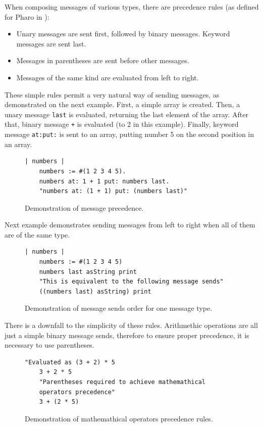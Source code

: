 \documentclass[thesis=M,english]{FITthesis}[2019/12/23]
\begin{document}
When composing messages of various types, there are precedence rules (as defined for Pharo in \cite{pharo-by-example}):
\begin{itemize}
	\item Unary messages are sent first, followed by binary messages. Keyword messages are sent last.
	\item Messages in parentheses are sent before other messages.
	\item Messages of the same kind are evaluated from left to right. 
\end{itemize}

These simple rules permit a very natural way of sending messages, as demonstrated on the next example.
First, a simple array is created. Then, a unary message \texttt{last} is evaluated, returning the last
element of the array. After that, binary message \texttt{+} is evaluated (to 2 in this example). Finally,
keyword message \texttt{at:put:} is sent to an array, putting number 5 on the second position in an array.
\begin{figure}[h!]
\begin{lstlisting}[language=Smalltalk]
	| numbers |
	numbers := #(1 2 3 4 5).
	numbers at: 1 + 1 put: numbers last.
	"numbers at: (1 + 1) put: (numbers last)"
\end{lstlisting}
\caption{Demonstration of message precedence.}
\end{figure}

Next example demonstrates sending messages from left to right when all of them are of the same type.
\begin{figure}[h!]
\begin{lstlisting}[language=Smalltalk]
	| numbers |
	numbers := #(1 2 3 4 5)
	numbers last asString print
	"This is equivalent to the following message sends"
	((numbers last) asString) print
\end{lstlisting}
\caption{Demonstration of message sends order for one message type.}
\end{figure}

There is a downfall to the simplicity of these rules. Arithmethic operations are all just a simple binary
message sends, therefore to ensure proper precedence, it is necessary to use parentheses.
\begin{figure}[h!]
\begin{lstlisting}[language=Smalltalk]
	"Evaluated as (3 + 2) * 5
	3 + 2 * 5
	"Parentheses required to achieve mathemathical
	operators precedence"
	3 + (2 * 5)
\end{lstlisting}
\caption{Demonstration of mathemathical operators precedence rules.}
\end{figure}
\end{document}
